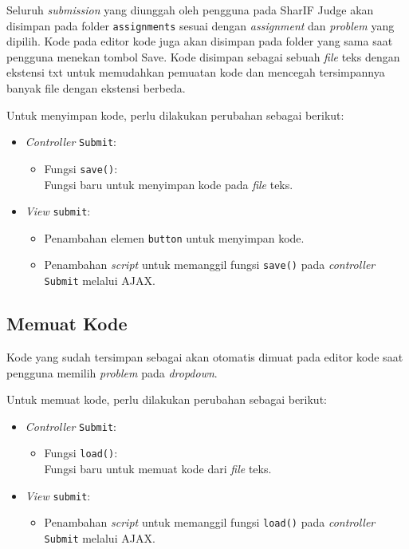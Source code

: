 Seluruh \textit{submission} yang diunggah oleh pengguna pada SharIF Judge akan disimpan pada folder \verb|assignments| sesuai dengan \textit{assignment} dan \textit{problem} yang dipilih. Kode pada editor kode juga akan disimpan pada folder yang sama saat pengguna menekan tombol Save. Kode disimpan sebagai sebuah \textit{file} teks dengan ekstensi txt untuk memudahkan pemuatan kode dan mencegah tersimpannya banyak file dengan ekstensi berbeda.

Untuk menyimpan kode, perlu dilakukan perubahan sebagai berikut:
\begin{itemize}
	\item \textit{Controller} \verb|Submit|:
    \begin{itemize}
		\item Fungsi \verb|save()|: \\ Fungsi baru untuk menyimpan kode pada \textit{file} teks.
    \end{itemize}
    \item \textit{View} \verb|submit|:
    \begin{itemize}
        \item Penambahan elemen \verb|button| untuk menyimpan kode.
        \item Penambahan \textit{script} untuk memanggil fungsi \verb|save()| pada \textit{controller} \verb|Submit| melalui AJAX. 
    \end{itemize}
\end{itemize}

\subsection{Memuat Kode}
\label{subsec:4:muat}

Kode yang sudah tersimpan sebagai akan otomatis dimuat pada editor kode saat pengguna memilih \textit{problem} pada \textit{dropdown}.

Untuk memuat kode, perlu dilakukan perubahan sebagai berikut:
\begin{itemize}
	\item \textit{Controller} \verb|Submit|:
    \begin{itemize}
		\item Fungsi \verb|load()|: \\ Fungsi baru untuk memuat kode dari \textit{file} teks.
    \end{itemize}
    \item \textit{View} \verb|submit|:
    \begin{itemize}
        \item Penambahan \textit{script} untuk memanggil fungsi \verb|load()| pada \textit{controller} \verb|Submit| melalui AJAX. 
    \end{itemize}
\end{itemize}

